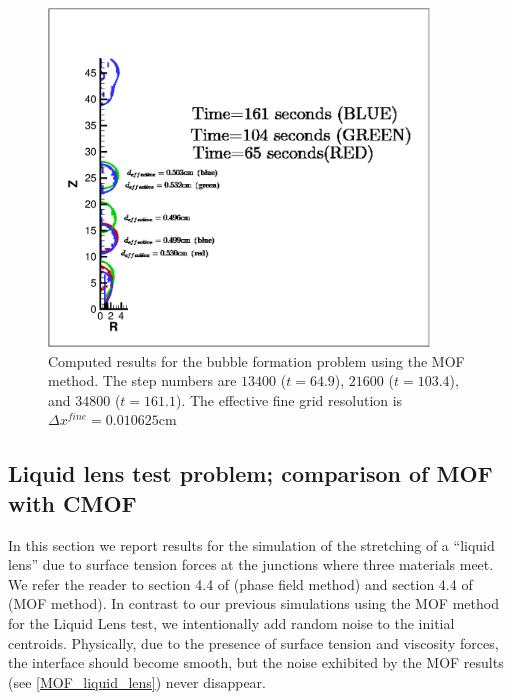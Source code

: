 \documentclass[]{article}
\begin{document}
\begin{figure}[htbp]
\centering
\includegraphics[width=0.9\textwidth]{MOF_formation.eps} 
\caption{Computed results for the bubble formation problem using the
	MOF method.  The step numbers are $13400$ ($t=64.9$), 
	$21600$ ($t=103.4$), and $34800$ ($t=161.1$).  The effective
	fine grid resolution is $\Delta x^{fine}=0.010625$cm}
 \label{MOF_bubble_formation}
\end{figure}


\subsection{Liquid lens test problem; comparison of MOF with CMOF 
\label{liqlens}}

In this section we report results for the simulation of the stretching
of a ``liquid lens'' due to surface tension forces at the junctions where
three materials meet.  We refer the reader to section 4.4 of 
\cite{kim2007phase} (phase field method) and
section 4.4 of \cite{li2015multiphase} (MOF method).  In contrast to our
previous simulations using the MOF method \cite{li2015multiphase} for the
Liquid Lens test, we intentionally add random noise to the initial
centroids.  Physically, due to the presence of surface tension and 
viscosity forces, the interface should become smooth, but the 
noise exhibited by the MOF results (see \ref{MOF_liquid_lens}) never 
disappear.  
\end{document}
